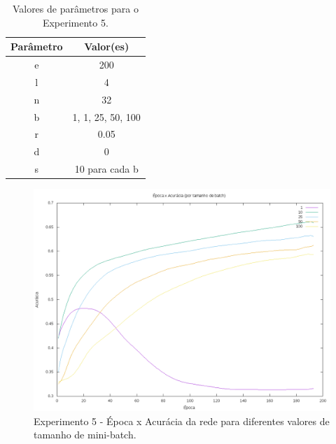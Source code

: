 \documentclass[12pt]{article}
\begin{document}
\begin{table}[h]
	\centering
	\begin{tabular}{|c|c|}
		\hline
		\textbf{Parâmetro} & \textbf{Valor(es)} \\ \hline
		e & 200 \\ \hline
		l & 4 \\ \hline
		n & 32 \\ \hline
		b & {1, 1, 25, 50, 100} \\ \hline
		r & 0.05 \\ \hline
		d & 0 \\ \hline
		s & 10 para cada b \\ \hline
	\end{tabular}
	\caption{\label{tab:exp5} Valores de parâmetros para o Experimento
	5.}
\end{table}

\begin{figure}[h]
  \centering
  \includegraphics[width=1\textwidth]{../tests/5-batch/graph1.png}
  \caption{Experimento 5 - Época x Acurácia da rede para diferentes
  valores de tamanho de mini-batch.}
  \label{fig:exp51}
\end{figure}
\end{document}

